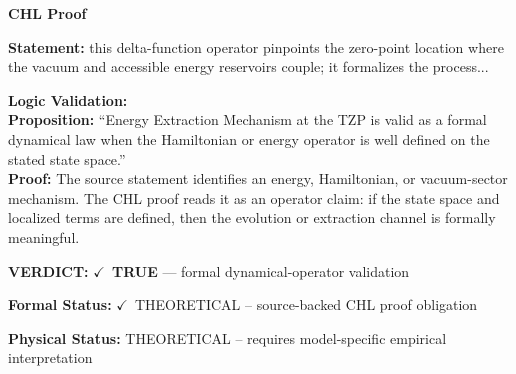 \vspace{0.45em}
\noindent\textbf{CHL Proof}\par
\textbf{Statement:} this delta-function operator pinpoints the zero-point location where the vacuum and
accessible energy reservoirs couple; it formalizes the process...

\textbf{Logic Validation:}\\
\textbf{Proposition:} ``Energy Extraction Mechanism at the TZP is valid as a formal dynamical law when the
Hamiltonian or energy operator is well defined on the stated state space.''\\
\textbf{Proof:} The source statement identifies an energy, Hamiltonian, or vacuum-sector mechanism. The
CHL proof reads it as an operator claim: if the state space and localized terms are
defined, then the evolution or extraction channel is formally meaningful.

\textbf{VERDICT:} \ensuremath{\checkmark}\ \textbf{TRUE} --- formal dynamical-operator validation

\textbf{Formal Status:} \ensuremath{\checkmark}\ THEORETICAL -- source-backed CHL proof obligation

\textbf{Physical Status:} THEORETICAL -- requires model-specific empirical interpretation
\par\vspace{0.45em}
\par
\ifTZPDarkEdition
{}
\fi
\endgroup
\endgroup
